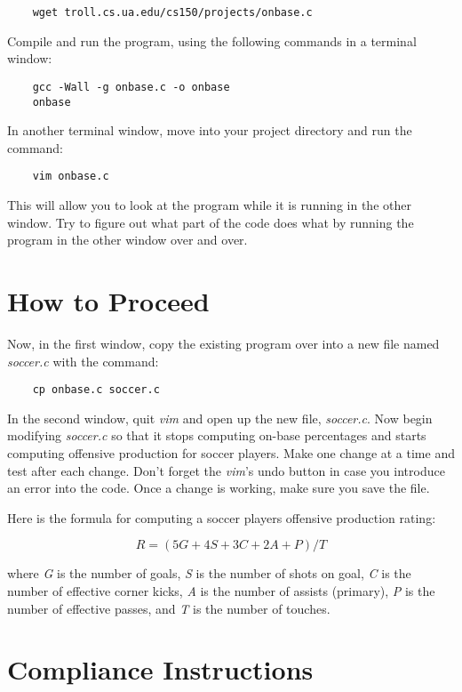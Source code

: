 \documentclass[12pt]{article}
\begin{document}
\begin{verbatim}
    wget troll.cs.ua.edu/cs150/projects/onbase.c
\end{verbatim}

Compile and run the program, using the following commands in a terminal
window:

\begin{verbatim}
    gcc -Wall -g onbase.c -o onbase 
    onbase
\end{verbatim}

In another terminal window, move into your project directory and run
the command:

\begin{verbatim}
    vim onbase.c
\end{verbatim}

This will allow you to look at the program while it is running in the
other window.
Try to figure out what part of the code does what by running the program
in the other window over and over.

\section*{How to Proceed}

Now, in the first window,
copy the existing program over into a new file named {\it soccer.c}
with the command:

\begin{verbatim}
    cp onbase.c soccer.c
\end{verbatim}

In the second window, quit {\it vim} and open up the new file, {\it soccer.c}.
Now begin modifying {\it soccer.c} so that it stops computing 
on-base percentages
and starts computing offensive production for soccer players.
Make one change at a time and test after each change.
Don't forget the {\it vim}'s undo button in case you introduce an error
into the code. Once a change is working, make sure you save the file.

Here is the 
formula for computing a soccer players offensive production rating:

\[
R = (5 G + 4 S + 3 C + 2 A + P) / T
\]

where
{\it G} is the number of goals,
{\it S} is the number of shots on goal,
{\it C} is the number of effective corner kicks,
{\it A} is the number of assists (primary),
{\it P} is the number of effective passes, and
{\it T} is the number of touches.

\section*{Compliance Instructions}
\end{document}
